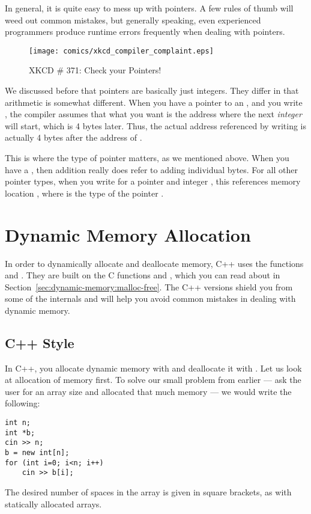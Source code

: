 In general, it is quite easy to mess up with pointers.
A few rules of thumb will weed out common mistakes,
but generally speaking, even experienced programmers produce runtime
errors frequently when dealing with pointers.

\begin{figure}[htb]
\centering
\texttt{[image: comics/xkcd\_compiler\_complaint.eps]}
\caption{XKCD \# 371: Check your Pointers!}
\end{figure}


We discussed before that pointers are basically just integers.
They differ in that arithmetic is somewhat different.
When you have a pointer  to an ,
and you write ,
the compiler assumes that what you want is the address
where the next \emph{integer} will start, which is 4 bytes later.
Thus, the actual address referenced by writing  is actually
4 bytes after the address of .

This is where the type of pointer matters, as we mentioned above. 
When you have a , then addition really does refer to
adding individual bytes. For all other pointer types, when you write
 for a pointer  and integer , 
this references memory location , where
 is the type of the pointer .

\section{Dynamic Memory Allocation}
In order to dynamically allocate and deallocate memory,
C++ uses the functions  and .
They are built on the C functions  and ,
which you can read about in Section~\ref{sec:dynamic-memory:malloc-free}.
The C++ versions shield you from some of the internals and will help
you avoid common mistakes in dealing with dynamic memory.

\subsection{C++ Style}
In C++, you allocate dynamic memory with 
and deallocate it with .
Let us look at allocation of memory first.
To solve our small problem from earlier --- ask the user for an array
size and allocated that much memory --- we would write the following:

\begin{verbatim}
int n;
int *b;
cin >> n;
b = new int[n];
for (int i=0; i<n; i++)
    cin >> b[i];
\end{verbatim}
The desired number of  spaces in the array is given in
square brackets, as with statically allocated arrays.

